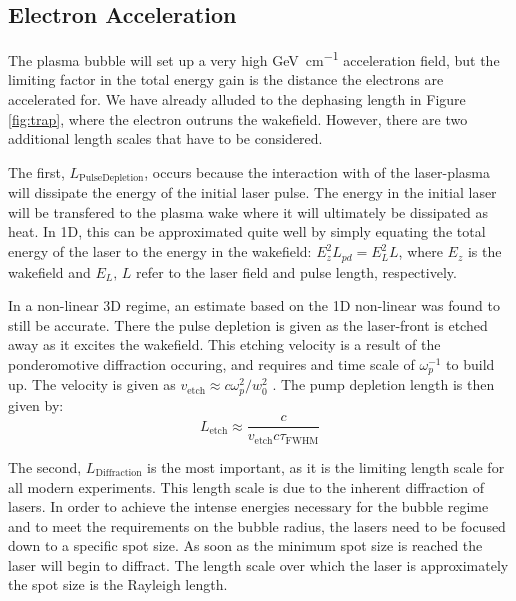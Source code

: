 \documentclass[12pt,letter]{article}
\begin{document}
    \subsection{Electron Acceleration}
    The plasma bubble will set up a very high \si{\giga \electronvolt \per
\centi \meter} acceleration field, but the limiting factor in the total energy
    gain is the distance the electrons are accelerated for. We have already
    alluded to the dephasing length in Figure \ref{fig:trap}, where the electron
    outruns the wakefield. However, there are two additional length scales that
    have to be considered.
    
    The first, $L_\mathrm{Pulse Depletion}$, occurs because the interaction
    with of the laser-plasma will dissipate the energy of the initial laser
    pulse. The energy in the initial laser will be transfered to the plasma
    wake where it will ultimately be dissipated as heat. In 1D, this can
    be approximated quite well by simply equating
    the total energy of the laser to the energy in the wakefield:
    $E_z^2L_{pd} = E_L^2L$, where $E_z$ is the wakefield and $E_L, \,L$ refer
    to the laser field and pulse length,
    respectively\cite{RevModPhys.81.1229}.

    In a non-linear 3D regime, an estimate based on the 1D non-linear was
    found to still be accurate. There the pulse depletion is given as the
    laser-front is etched away as it excites the wakefield. This etching
    velocity is a result of the ponderomotive diffraction occuring, and requires
    and time scale of $\omega_p^{-1}$ to build up. The velocity is given as $v_\textrm{etch}
    \approx c \omega_p^2 /w_0^2$ \cite{deckedevolv}. The pump depletion
    length is then given by:
    \begin{equation}
        L_\textrm{etch} \approx \frac{c}{v_\textrm{etch} c
            \tau_\textrm{FWHM}}
        \end{equation}

        The second, $L_\mathrm{Diffraction}$ is the most important, as it is
    the limiting length scale for all modern experiments. This length scale is due to the inherent
    diffraction of lasers. In order to achieve the intense energies necessary
    for the bubble regime and to meet the requirements on the bubble radius, the lasers need to be focused down to a specific spot
    size. As soon as the minimum spot size is reached the laser will begin to
    diffract. The length scale over which the laser is approximately the spot size is
    the Rayleigh length. 
\end{document}
